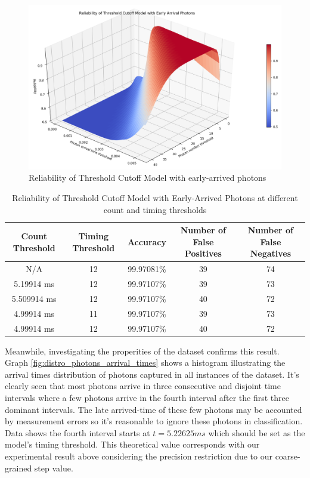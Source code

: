 \documentclass[letterpaper,twocolumn,10pt]{article}
\begin{document}
\begin{figure}
    \includegraphics[width=\linewidth]{Figures/threshold_cutoff_early_arrival_accuracy.png}
    \centering
    \caption{Reliability of Threshold Cutoff Model with early-arrived photons}
    \label{fig:threshold_cutoff_early_arrival}
\end{figure}

\begin{table}
    \caption{Reliability of Threshold Cutoff Model with Early-Arrived Photons at different count and timing thresholds}
    \begin{center}
        \begin{tabular}{c c c c c}
            Count Threshold & Timing Threshold & Accuracy & Number of False Positives & Number of False Negatives \\ [0.5ex] 
            \hline
            N/A	& 12 & 99.97081\% & 39 & 74 \\
            5.19914	ms & 12 & 99.97107\% & 39 & 73 \\ 
            5.509914 ms & 12 & 99.97107\% & 40 & 72 \\
            4.99914 ms & 11 & 99.97107\% & 39 & 73 \\
            4.99914 ms & 12 & 99.97107\% & 40 & 72 \\
       \end{tabular}
    \end{center}
    \label{table:threshold_cutoff_early_arrival}  
\end{table}

Meanwhile, investigating the properities of the dataset confirms this result. Graph \ref{fig:distro_photons_arrival_times} shows a histogram illustrating the arrival times distribution of photons captured in all instances of the dataset. It's clearly seen that most photons arrive in three consecutive and disjoint time intervals where a few photons arrive in the fourth interval after the first three dominant intervals. The late arrived-time of these few photons may be accounted by measurement errors so it's reasonable to ignore these photons in classification. Data shows the fourth interval starts at $t = 5.22625 ms$ which should be set as the model's timing threshold. This theoretical value corresponds with our experimental result above considering the precision restriction due to our coarse-grained step value.
\end{document}
